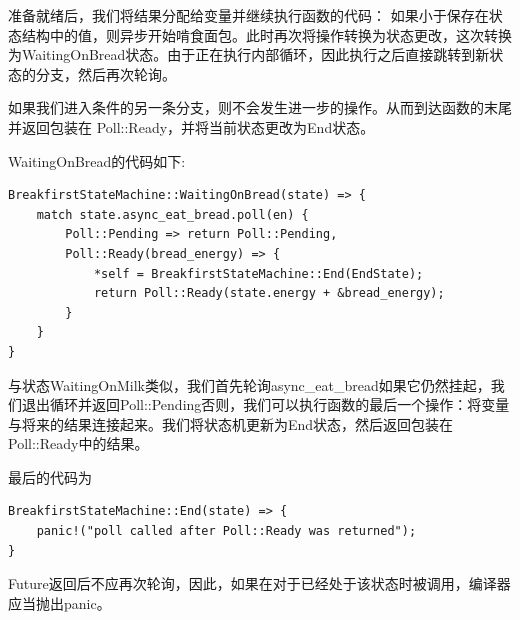 准备就绪后，我们将结果分配给变量并继续执行函数的代码： 如果小于保存在状态结构中的值，则异步开始啃食面包。此时再次将操作转换为状态更改，这次转换为WaitingOnBread状态。由于正在执行内部循环，因此执行之后直接跳转到新状态的分支，然后再次轮询。

如果我们进入条件的另一条分支，则不会发生进一步的操作。从而到达函数的末尾并返回包装在 Poll::Ready，并将当前状态更改为End状态。


WaitingOnBread的代码如下:

\begin{lstlisting}[caption=WaitingOnBread Branch]
BreakfirstStateMachine::WaitingOnBread(state) => {
    match state.async_eat_bread.poll(en) {
        Poll::Pending => return Poll::Pending,
        Poll::Ready(bread_energy) => {
            *self = BreakfirstStateMachine::End(EndState);
            return Poll::Ready(state.energy + &bread_energy);
        }
    }
} 
\end{lstlisting}
与状态WaitingOnMilk类似，我们首先轮询async\_eat\_bread如果它仍然挂起，我们退出循环并返回Poll::Pending否则，我们可以执行函数的最后一个操作：将变量与将来的结果连接起来。我们将状态机更新为End状态，然后返回包装在Poll::Ready中的结果。

最后的代码为

\begin{lstlisting}[caption=End Branch]
BreakfirstStateMachine::End(state) => {
    panic!("poll called after Poll::Ready was returned");
} 
\end{lstlisting}
Future返回后不应再次轮询，因此，如果在对于已经处于该状态时被调用，编译器应当抛出panic。

